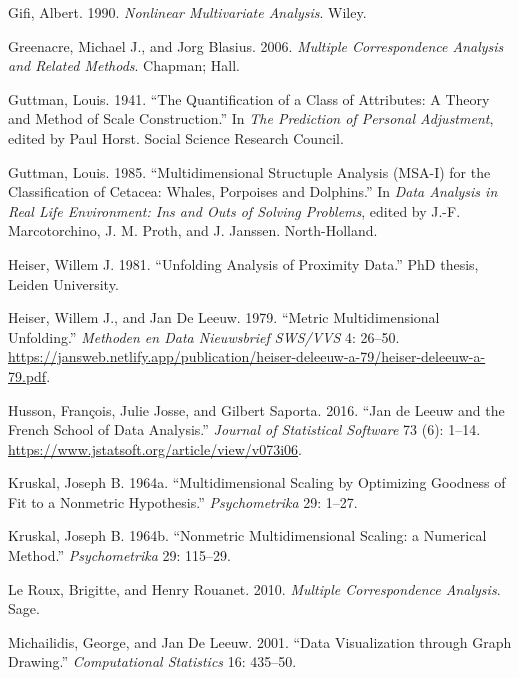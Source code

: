 \documentclass[
  12pt,
  letterpaper,
  DIV=11,
  numbers=noendperiod]{scrartcl}
\newlength{\cslhangindent}
\newenvironment{CSLReferences}[2] %
 {\begin{list}{}{%
  \setlength{\itemindent}{0pt}
  \setlength{\leftmargin}{0pt}
  \setlength{\parsep}{0pt}
  \ifodd #1
   \setlength{\leftmargin}{\cslhangindent}
   \setlength{\itemindent}{-1\cslhangindent}
  \fi
  \setlength{\itemsep}{#2\baselineskip}}}
 {\end{list}}
\begin{document}
\begin{CSLReferences}{1}{1}
Gifi, Albert. 1990. \emph{Nonlinear Multivariate Analysis}. Wiley.

Greenacre, Michael J., and Jorg Blasius. 2006. \emph{{Multiple
Correspondence Analysis and Related Methods}}. Chapman; Hall.

Guttman, Louis. 1941. {``{The Quantification of a Class of Attributes: A
Theory and Method of Scale Construction}.''} In \emph{The Prediction of
Personal Adjustment}, edited by Paul Horst. Social Science Research
Council.

Guttman, Louis. 1985. {``{Multidimensional Structuple Analysis (MSA-I)
for the Classification of Cetacea: Whales, Porpoises and Dolphins}.''}
In \emph{Data Analysis in Real Life Environment: Ins and Outs of Solving
Problems}, edited by J.-F. Marcotorchino, J. M. Proth, and J. Janssen.
North-Holland.

Heiser, Willem J. 1981. {``Unfolding Analysis of Proximity Data.''} PhD
thesis, Leiden University.

Heiser, Willem J., and Jan De Leeuw. 1979. {``Metric Multidimensional
Unfolding.''} \emph{{Methoden en Data Nieuwsbrief SWS/VVS}} 4: 26--50.
\url{https://jansweb.netlify.app/publication/heiser-deleeuw-a-79/heiser-deleeuw-a-79.pdf}.

Husson, François, Julie Josse, and Gilbert Saporta. 2016. {``Jan de
Leeuw and the French School of Data Analysis.''} \emph{Journal of
Statistical Software} 73 (6): 1--14.
\url{https://www.jstatsoft.org/article/view/v073i06}.

Kruskal, Joseph B. 1964a. {``{Multidimensional Scaling by Optimizing
Goodness of Fit to a Nonmetric Hypothesis}.''} \emph{Psychometrika} 29:
1--27.

Kruskal, Joseph B. 1964b. {``{Nonmetric Multidimensional Scaling: a
Numerical Method}.''} \emph{Psychometrika} 29: 115--29.

Le Roux, Brigitte, and Henry Rouanet. 2010. \emph{Multiple
Correspondence Analysis}. Sage.

Michailidis, George, and Jan De Leeuw. 2001. {``{Data Visualization
through Graph Drawing}.''} \emph{Computational Statistics} 16: 435--50.


\end{CSLReferences}
\end{document}
